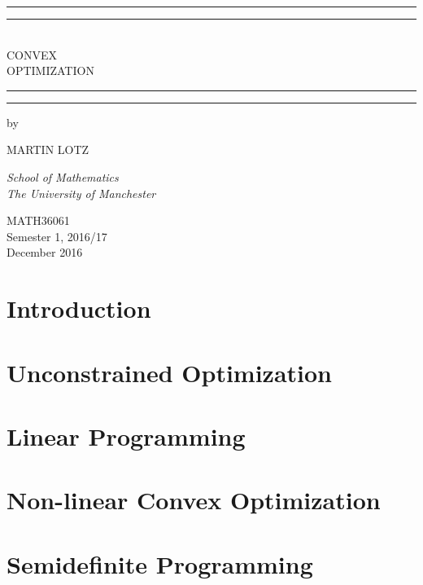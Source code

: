 \documentclass[12pt,a4paper]{memoir}
\newcommand*{\titleGP}{\begingroup %
\centering
\vspace*{\baselineskip}
\rule{\textwidth}{1.6pt}\vspace*{-\baselineskip}\vspace*{2pt}
\rule{\textwidth}{0.4pt}\\[\baselineskip]
{\LARGE CONVEX\\ OPTIMIZATION \\[0.3\baselineskip]}%
\rule{\textwidth}{0.4pt}\vspace*{-\baselineskip}\vspace{3.2pt}
\rule{\textwidth}{1.6pt}%
\vspace*{2\baselineskip}
by \\[\baselineskip]
{\Large MARTIN LOTZ\par}%
{\itshape School of Mathematics \\ The University of Manchester\par}
\vfill
{\large MATH36061\\ Semester 1, 2016/17\\ December 2016}\par
\endgroup}
\begin{document}

\frontmatter
\pagestyle{empty}
\titleGP







\newpage 

\tableofcontents

%

\mainmatter

\part{Introduction}

\part{Unconstrained Optimization}





\part{Linear Programming}







\part{Non-linear Convex Optimization}





\part{Semidefinite Programming}




%

% 
\setcounter{section}{0}
\setcounter{chapter}{1}



%
%
%
%
\end{document}
